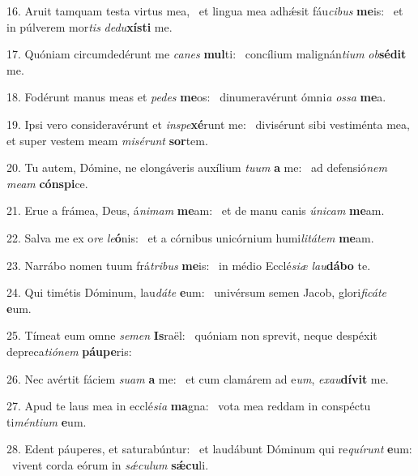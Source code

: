 16. Aruit tamquam testa virtus mea, \dag\  et lingua mea adhǽsit fáu\textit{ci}\textit{bus} \textbf{me}is: \ast\  et in púlverem mor\textit{tis} \textit{de}\textit{du}\textbf{xís}\textbf{ti} me.\

17. Quóniam circumdedérunt me \textit{ca}\textit{nes} \textbf{mul}ti: \ast\  concílium malignán\textit{ti}\textit{um} \textit{ob}\textbf{sé}\textbf{dit} me.\

18. Fodérunt manus meas et \textit{pe}\textit{des} \textbf{me}os: \ast\  dinumeravérunt ómni\textit{a} \textit{os}\textit{sa} \textbf{me}a.\

19. Ipsi vero consideravérunt et \textit{in}\textit{spe}\textbf{xé}runt me: \ast\  divisérunt sibi vestiménta mea, et super vestem meam \textit{mi}\textit{sé}\textit{runt} \textbf{sor}tem.\

20. Tu autem, Dómine, ne elongáveris auxílium \textit{tu}\textit{um} \textbf{a} me: \ast\  ad defensió\textit{nem} \textit{me}\textit{am} \textbf{cón}\textbf{spi}ce.\

21. Erue a frámea, Deus, á\textit{ni}\textit{mam} \textbf{me}am: \ast\  et de manu canis \textit{ú}\textit{ni}\textit{cam} \textbf{me}am.\

22. Salva me ex o\textit{re} \textit{le}\textbf{ó}nis: \ast\  et a córnibus unicórnium humi\textit{li}\textit{tá}\textit{tem} \textbf{me}am.\

23. Narrábo nomen tuum frá\textit{tri}\textit{bus} \textbf{me}is: \ast\  in médio Ecclé\textit{si}\textit{æ} \textit{lau}\textbf{dá}\textbf{bo} te.\

24. Qui timétis Dóminum, lau\textit{dá}\textit{te} \textbf{e}um: \ast\  univérsum semen Jacob, glori\textit{fi}\textit{cá}\textit{te} \textbf{e}um.\

25. Tímeat eum omne \textit{se}\textit{men} \textbf{Is}raël: \ast\  quóniam non sprevit, neque despéxit depreca\textit{ti}\textit{ó}\textit{nem} \textbf{páu}\textbf{pe}ris:\

26. Nec avértit fáciem \textit{su}\textit{am} \textbf{a} me: \ast\  et cum clamárem ad e\textit{um}, \textit{ex}\textit{au}\textbf{dí}\textbf{vit} me.\

27. Apud te laus mea in ecclé\textit{si}\textit{a} \textbf{ma}gna: \ast\  vota mea reddam in conspéctu ti\textit{mén}\textit{ti}\textit{um} \textbf{e}um.\

28. Edent páuperes, et saturabúntur: \dag\  et laudábunt Dóminum qui re\textit{quí}\textit{runt} \textbf{e}um: \ast\  vivent corda eórum in \textit{sǽ}\textit{cu}\textit{lum} \textbf{sǽ}\textbf{cu}li.\

